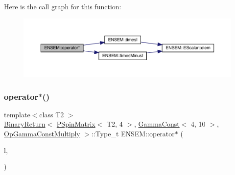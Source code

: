 Here is the call graph for this function\+:\nopagebreak
\begin{figure}[H]
\begin{center}
\leavevmode
\includegraphics[width=350pt]{d6/df5/group__primspinmatrix_ga25cb4484aedd17ae7862bb37c00fb7e0_cgraph}
\end{center}
\end{figure}
\mbox{\label{group__primspinmatrix_ga84b4002a13db59637f1e0b23a7382a52}} 
\subsubsection{\texorpdfstring{operator$\ast$()}{operator*()}\hspace{0.1cm}{\footnotesize\ttfamily [27/64]}}
{\footnotesize\ttfamily template$<$class T2 $>$ \\
\mbox{\hyperlink{structENSEM_1_1BinaryReturn}{Binary\+Return}}$<$ \mbox{\hyperlink{classENSEM_1_1PSpinMatrix}{P\+Spin\+Matrix}}$<$ T2, 4 $>$, \mbox{\hyperlink{classENSEM_1_1GammaConst}{Gamma\+Const}}$<$ 4, 10 $>$, \mbox{\hyperlink{structENSEM_1_1OpGammaConstMultiply}{Op\+Gamma\+Const\+Multiply}} $>$\+::Type\+\_\+t E\+N\+S\+E\+M\+::operator$\ast$ (\begin{DoxyParamCaption}\item[{const \mbox{\hyperlink{classENSEM_1_1PSpinMatrix}{P\+Spin\+Matrix}}$<$ T2, 4 $>$ \&}]{l,  }\item[{const \mbox{\hyperlink{classENSEM_1_1GammaConst}{Gamma\+Const}}$<$ 4, 10 $>$ \&}]{ }\end{DoxyParamCaption})\hspace{0.3cm}{\ttfamily [inline]}}

\mbox{\label{group__primspinmatrix_gaaf604778bbb015bcd9e40d133993fda3}} 
